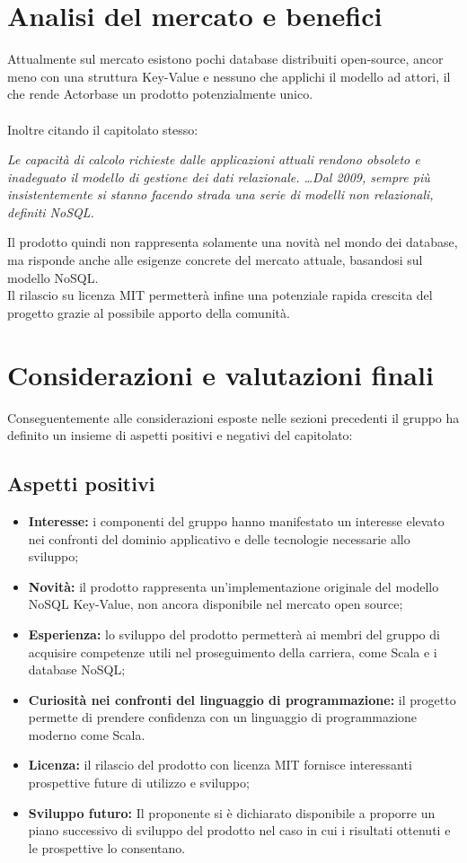 \documentclass[a4paper]{report}
\begin{document}
		\section{Analisi del mercato e benefici}
			Attualmente sul mercato esistono pochi database distribuiti open-source, ancor meno con una
			struttura Key-Value e nessuno che applichi il modello ad attori, il che rende Actorbase un prodotto
			potenzialmente unico. 
			\\ \\
			Inoltre citando il capitolato stesso:
			\begin{center}
				\emph{Le capacità di calcolo richieste dalle applicazioni attuali rendono obsoleto e inadeguato
				il modello di gestione dei dati relazionale. \dots \space Dal 2009, sempre più insistentemente si
				stanno facendo strada una serie di modelli non relazionali, definiti NoSQL.}
			\end{center}
			Il prodotto quindi non rappresenta solamente una novità nel mondo dei database, ma risponde 
			anche alle esigenze concrete del mercato attuale, basandosi sul modello NoSQL.\\
			Il rilascio su licenza MIT permetterà infine una potenziale rapida crescita del progetto grazie al
			possibile apporto della comunità.
		\section{Considerazioni e valutazioni finali}
			Conseguentemente alle considerazioni esposte nelle sezioni precedenti il gruppo ha definito un 
			insieme di aspetti positivi e negativi del capitolato:
			\subsection{Aspetti positivi}
				\begin{itemize}
					\item \textbf{Interesse:} i componenti del gruppo hanno manifestato un interesse elevato 
					nei confronti del dominio applicativo e delle tecnologie necessarie allo sviluppo;
					\item \textbf{Novità:} il prodotto rappresenta un'implementazione originale del modello 
					NoSQL Key-Value, non ancora disponibile nel mercato open source;
					\item \textbf{Esperienza:} lo sviluppo del prodotto permetterà ai membri del gruppo di 
					acquisire competenze utili nel proseguimento della carriera, come Scala e i database NoSQL;
					\item \textbf{Curiosità nei confronti del linguaggio di programmazione:} il progetto permette 
					di prendere confidenza con un linguaggio di programmazione moderno come Scala.
					\item \textbf{Licenza:} il rilascio del prodotto con licenza MIT fornisce interessanti
					 prospettive future di utilizzo e sviluppo;
					\item \textbf{Sviluppo futuro:} Il proponente si è dichiarato disponibile a proporre un piano
					successivo di sviluppo del prodotto nel caso in cui i risultati ottenuti e le prospettive lo
					 consentano.
				\end{itemize}
\end{document}
